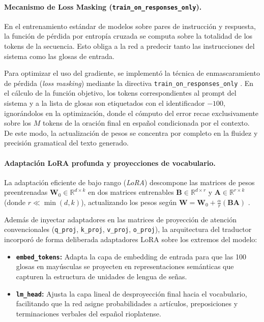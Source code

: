 \paragraph{Mecanismo de Loss Masking (\texttt{train\_on\_responses\_only}).}
En el entrenamiento estándar de modelos sobre pares de instrucción y respuesta, la función de pérdida por entropía cruzada se computa sobre la totalidad de los tokens de la secuencia. Esto obliga a la red a predecir tanto las instrucciones del sistema como las glosas de entrada.

Para optimizar el uso del gradiente, se implementó la técnica de enmascaramiento de pérdida (\textit{loss masking}) mediante la directiva \texttt{train\_on\_responses\_only} \parencite{huggingface2024transformers}. En el cálculo de la función objetivo, los tokens correspondientes al prompt del sistema y a la lista de glosas son etiquetados con el identificador $-100$, ignorándolos en la optimización, donde el cómputo del error recae exclusivamente sobre los $M$ tokens de la oración final en español condicionada por el contexto. De este modo, la actualización de pesos se concentra por completo en la fluidez y precisión gramatical del texto generado.

\paragraph{Adaptación LoRA profunda y proyecciones de vocabulario.}
La adaptación eficiente de bajo rango (\textit{LoRA}) descompone las matrices de pesos preentrenadas $\mathbf{W}_0 \in \mathbb{R}^{d \times k}$ en dos matrices entrenables $\mathbf{B} \in \mathbb{R}^{d \times r}$ y $\mathbf{A} \in \mathbb{R}^{r \times k}$ (donde $r \ll \min(d, k)$), actualizando los pesos según $\mathbf{W} = \mathbf{W}_0 + \frac{\alpha}{r}(\mathbf{B}\mathbf{A})$ \parencite{hu2022lora}.

Además de inyectar adaptadores en las matrices de proyección de atención convencionales (\texttt{q\_proj}, \texttt{k\_proj}, \texttt{v\_proj}, \texttt{o\_proj}), la arquitectura del traductor incorporó de forma deliberada adaptadores LoRA sobre los extremos del modelo:
\begin{itemize}
    \item \textbf{\texttt{embed\_tokens}:} Adapta la capa de embedding de entrada para que las 100 glosas en mayúsculas se proyecten en representaciones semánticas que capturen la estructura de unidades de lengua de señas.
    \item \textbf{\texttt{lm\_head}:} Ajusta la capa lineal de desproyección final hacia el vocabulario, facilitando que la red asigne probabilidades a artículos, preposiciones y terminaciones verbales del español rioplatense.
\end{itemize}

